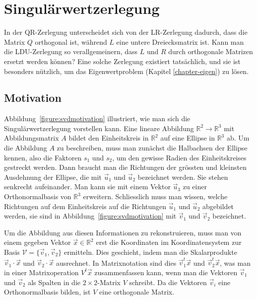 %
%
%
\section{Singulärwertzerlegung\label{section-svd}}
In der QR-Zerlegung unterscheidet sich von der LR-Zerlegung
dadurch, dass die Matrix $Q$ orthogonal ist, während $L$ eine
untere Dreiecksmatrix ist.
Kann man die LDU-Zerlegung so verallgemeinern,
dass $L$ und $R$ durch orthogonale Matrizen ersetzt
werden können?  Eine solche Zerlegung existiert tatsächlich,
und sie ist besonders nützlich, um das Eigenwertproblem
(Kapitel \ref{chapter-eigen}) zu lösen.


\subsection{Motivation
\label{subsection:svd:motivation}}
Abbildung~\ref{figure:svdmotivation} illustriert, wie man sich die 
Singulärwertzerlegung vorstellen kann.
Eine lineare Abbildung $\mathbb{R}^2\to\mathbb{R}^3$ mit Abbildungsmatrix
$A$ bildet den Einheitskreis  in $\mathbb{R}^2$ auf eine Ellipse in
$\mathbb{R}^3$ ab.
Um die Abbildung $A$ zu beschreiben, muss man zunächst die Halbachsen
der Ellipse kennen, also die Faktoren $s_1$ und $s_2$, um den gewisse
Radien des Einheitskreises gestreckt werden.
Dann braucht man die Richtungen der grössten und kleinsten Ausdehnung
der Ellipse, die mit $\vec{u}_1$ und $\vec{u}_2$ bezeichnet werden.
Sie stehen senkrecht aufeinander. 
Man kann sie mit einem Vektor $\vec{u}_3$ zu einer Orthonormalbasis
von $\mathbb{R}^3$ erweitern.
Schliesslich muss man wissen, welche Richtungen auf dem Einheitskreis
auf die Richtungen $\vec{u}_1$ und $\vec{u}_2$ abgebildet werden,
sie sind in Abbildung~\ref{figure:svdmotivation} mit $\vec{v}_1$ und
$\vec{v}_2$ bezeichnet.

Um die Abbildung aus diesen Informationen zu rekonstruieren, muss man
von einem gegeben Vektor $\vec{x}\in\mathbb{R}^2$ erst die Koordinaten im
Koordinatensystem zur Basis $\mathcal{V}=\{\vec{v}_1,\vec{v}_2\}$ ermitteln.
Dies geschieht, indem man die Skalarprodukte $\vec{v}_1\cdot \vec{x}$ und
$\vec{v}_2\cdot \vec{x}$ ausrechnet.
In Matrixnotation sind dies
$\vec{v}_1^t\vec{x}$
und
$\vec{v}_2^t\vec{x}$,
was man in einer Matrixoperation $V^t\vec{x}$ zusammenfassen kann, wenn
man die Vektoren $\vec{v}_1$ und $\vec{v}_2$ als Spalten in die 
$2\times 2$-Matrix $V$ schreibt.
Da die Vektoren $\vec{v}_i$ eine Orthonormalbasis bilden, ist $V$ eine
orthogonale Matrix.

